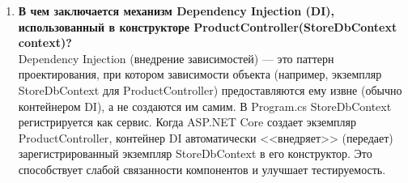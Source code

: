 \documentclass[12pt]{article}
\renewcommand{\texttt}[1]{{\small\ttfamily #1}}
\numberwithin{listing}{section}
\numberwithin{figure}{section}
\begin{document}
\begin{enumerate}
	\item \textbf{В чем заключается механизм Dependency Injection (DI), использованный в конструкторе \texttt{ProductController(StoreDbContext context)}?} \\
	      Dependency Injection (внедрение зависимостей) — это паттерн проектирования, при котором зависимости объекта (например, экземпляр \texttt{StoreDbContext} для \texttt{ProductController}) предоставляются ему извне (обычно контейнером DI), а не создаются им самим. В \texttt{Program.cs} \texttt{StoreDbContext} регистрируется как сервис. Когда ASP.NET Core создает экземпляр \texttt{Product\-Controller}, контейнер DI автоматически <<внедряет>> (передает) зарегистрированный экземпляр \texttt{StoreDbContext} в его конструктор. Это способствует слабой связанности компонентов и улучшает тестируемость.
\end{enumerate}
\end{document}
